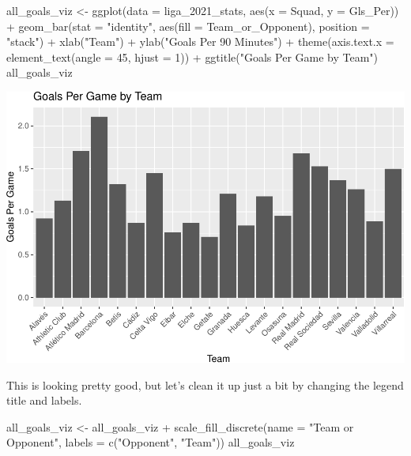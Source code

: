 \documentclass[
  11pt,
]{book}
\newenvironment{Shaded}{\begin{snugshade}}{\end{snugshade}}
\newcommand{\AttributeTok}[1]{\textcolor[rgb]{0.77,0.63,0.00}{#1}}
\newcommand{\DecValTok}[1]{\textcolor[rgb]{0.00,0.00,0.81}{#1}}
\newcommand{\FunctionTok}[1]{\textcolor[rgb]{0.00,0.00,0.00}{#1}}
\newcommand{\NormalTok}[1]{#1}
\newcommand{\OtherTok}[1]{\textcolor[rgb]{0.56,0.35,0.01}{#1}}
\newcommand{\SpecialCharTok}[1]{\textcolor[rgb]{0.00,0.00,0.00}{#1}}
\newcommand{\StringTok}[1]{\textcolor[rgb]{0.31,0.60,0.02}{#1}}
\theoremstyle{definition}
\theoremstyle{definition}
\theoremstyle{definition}
\theoremstyle{definition}
\theoremstyle{remark}
\begin{document}
\begin{Shaded}
\begin{Highlighting}[]
\NormalTok{all\_goals\_viz }\OtherTok{\textless{}{-}} \FunctionTok{ggplot}\NormalTok{(}\AttributeTok{data =}\NormalTok{ liga\_2021\_stats, }\FunctionTok{aes}\NormalTok{(}\AttributeTok{x =}\NormalTok{ Squad, }\AttributeTok{y =}\NormalTok{ Gls\_Per)) }\SpecialCharTok{+} \FunctionTok{geom\_bar}\NormalTok{(}\AttributeTok{stat =} \StringTok{"identity"}\NormalTok{,}
    \FunctionTok{aes}\NormalTok{(}\AttributeTok{fill =}\NormalTok{ Team\_or\_Opponent), }\AttributeTok{position =} \StringTok{"stack"}\NormalTok{) }\SpecialCharTok{+} \FunctionTok{xlab}\NormalTok{(}\StringTok{"Team"}\NormalTok{) }\SpecialCharTok{+} \FunctionTok{ylab}\NormalTok{(}\StringTok{"Goals Per 90 Minutes"}\NormalTok{) }\SpecialCharTok{+}
    \FunctionTok{theme}\NormalTok{(}\AttributeTok{axis.text.x =} \FunctionTok{element\_text}\NormalTok{(}\AttributeTok{angle =} \DecValTok{45}\NormalTok{, }\AttributeTok{hjust =} \DecValTok{1}\NormalTok{)) }\SpecialCharTok{+} \FunctionTok{ggtitle}\NormalTok{(}\StringTok{"Goals Per Game by Team"}\NormalTok{)}
\NormalTok{all\_goals\_viz}
\end{Highlighting}
\end{Shaded}

\includegraphics{series_files/figure-latex/unnamed-chunk-13-1.pdf}

This is looking pretty good, but let's clean it up just a bit by changing the legend title and labels.

\begin{Shaded}
\begin{Highlighting}[]
\NormalTok{all\_goals\_viz }\OtherTok{\textless{}{-}}\NormalTok{ all\_goals\_viz }\SpecialCharTok{+} \FunctionTok{scale\_fill\_discrete}\NormalTok{(}\AttributeTok{name =} \StringTok{"Team or Opponent"}\NormalTok{, }\AttributeTok{labels =} \FunctionTok{c}\NormalTok{(}\StringTok{"Opponent"}\NormalTok{,}
    \StringTok{"Team"}\NormalTok{))}
\NormalTok{all\_goals\_viz}
\end{Highlighting}
\end{Shaded}
\end{document}
